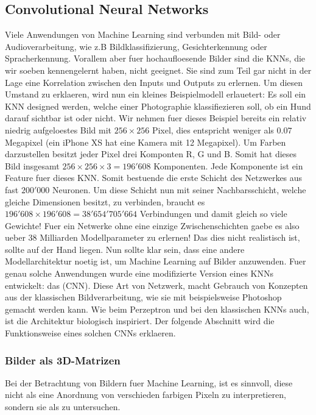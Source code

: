 \documentclass[../main]{subfiles}
\begin{document}
\subsection{Convolutional Neural Networks}
\cite{deeplearning.ai:cnn}
Viele Anwendungen von Machine Learning sind verbunden mit Bild- oder
Audioverarbeitung, wie z.B Bildklassifizierung, Gesichterkennung oder
Spracherkennung.
Vorallem aber fuer hochaufloesende Bilder sind die KNNs, die wir soeben
kennengelernt haben, nicht geeignet. Sie sind zum Teil gar nicht in der
Lage eine Korrelation zwischen den Inputs und Outputs zu erlernen.
Um diesen Umstand zu erklaeren, wird nun ein kleines Beispielmodell erlauetert:
\para{}
Es soll ein KNN designed werden, welche einer Photographie klassifiezieren
soll, ob ein Hund darauf sichtbar ist oder nicht. Wir nehmen fuer dieses
Beispiel bereits ein relativ niedrig aufgeloestes Bild mit $256 \times 256$
Pixel, dies entspricht weniger als $0.07$ Megapixel (ein iPhone XS hat eine Kamera mit
12 Megapixel). Um Farben darzustellen besitzt jeder Pixel drei Komponten R, G
und B. Somit hat dieses Bild insgesamt $256 \times 256 \times 3 = 196'608$
Komponenten. Jede Komponente ist ein Feature fuer dieses KNN. Somit bestuende
die erste Schicht des Netzwerkes aus fast $200'000$ Neuronen. Um diese Schicht
nun mit seiner Nachbarsschicht, welche gleiche Dimensionen besitzt, zu verbinden, braucht
es $196'608 \times 196'608 = 38'654'705'664$ Verbindungen und damit gleich so
viele Gewichte! Fuer ein Netwerke ohne eine einzige Zwischenschichten gaebe es
also ueber 38 Milliarden Modellparameter zu erlernen! Das dies nicht realistisch ist,
sollte auf der Hand liegen.
\para{}
Nun sollte klar sein, dass eine andere Modellarchitektur noetig ist, um Machine
Learning auf Bilder anzuwenden. Fuer genau solche Anwendungen wurde eine modifizierte
Version eines KNNs entwickelt: das  (CNN).
Diese Art von Netzwerk, macht Gebrauch von Konzepten aus der klassischen
Bildverarbeitung, wie sie mit beispielsweise Photoshop gemacht werden kann.
Wie beim Perzeptron und bei den klassischen KNNs auch, ist die Architektur
biologisch inspiriert.
Der folgende Abschnitt wird die Funktionsweise eines solchen CNNs erklaeren.


\subsubsection{Bilder als 3D-Matrizen}
Bei der Betrachtung von Bildern fuer Machine Learning, ist es sinnvoll, diese
nicht als eine Anordnung von verschieden farbigen Pixeln zu interpretieren,
sondern sie als  zu untersuchen.
\end{document}
